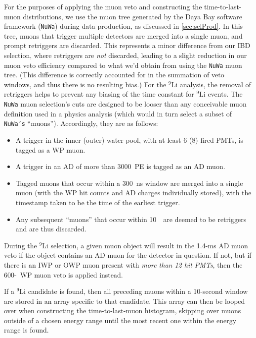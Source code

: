 \documentclass[../thesis.tex]{subfiles}
\begin{document}
For the purposes of applying the muon veto and constructing the time-to-last-muon distributions, we use the muon tree generated by the Daya Bay software framework (\texttt{NuWa}) during data production, as discussed in \autoref{sec:selProd}. In this tree, muons that trigger multiple detectors are merged into a single muon, and prompt retriggers are discarded. This represents a minor difference from our IBD selection, where retriggers are \emph{not} discarded, leading to a slight reduction in our muon veto efficiency compared to what we'd obtain from using the \texttt{NuWa} muon tree. (This difference is correctly accounted for in the summation of veto windows, and thus there is no resulting bias.) For the $^9$Li analysis, the removal of retriggers helps to prevent any biasing of the time constant for $^9$Li events. The \texttt{NuWa} muon selection's cuts are designed to be looser than any conceivable muon definition used in a physics analysis (which would in turn select a subset of \texttt{NuWa's} ``muons''). Accordingly, they are as follows:

\begin{itemize}
\item A trigger in the inner (outer) water pool, with at least 6 (8) fired PMTs, is tagged as a WP muon.
\item A trigger in an AD of more than 3000~PE is tagged as an AD muon.
\item Tagged muons that occur within a 300~ns window are merged into a single muon (with the WP hit counts and AD charges individually stored), with the timestamp taken to be the time of the earliest trigger.
\item Any subsequent ``muons'' that occur within 10~\us\ are deemed to be retriggers and are thus discarded.
\end{itemize}

During the $^9$Li selection, a given muon object will result in the 1.4-ms AD muon veto if the object contains an AD muon for the detector in question. If not, but if there is an IWP or OWP muon present with \emph{more than 12 hit PMTs}, then the 600-\us\ WP muon veto is applied instead.

If a $^9$Li candidate is found, then all preceding muons within a 10-second window are stored in an array specific to that candidate. This array can then be looped over when constructing the time-to-last-muon histogram, skipping over muons outside of a chosen energy range until the most recent one within the energy range is found.
\end{document}

